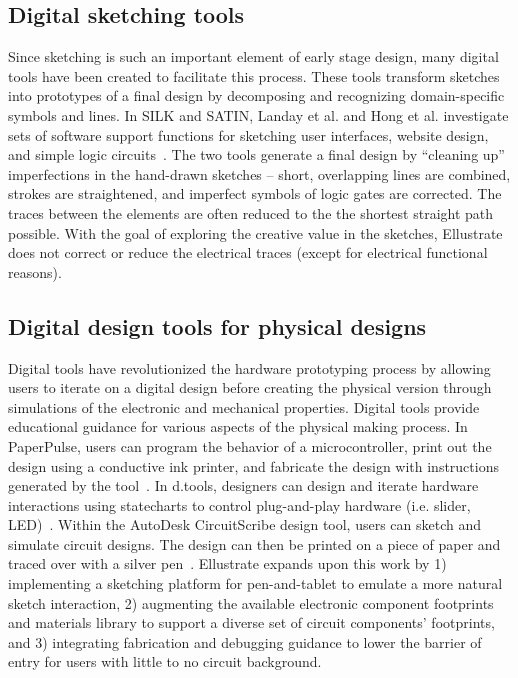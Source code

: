 \documentclass{sigchi}
\begin{document}
\subsection{Digital sketching tools} 
Since sketching is such an important element of early stage design, many digital tools have been created to facilitate this process. These tools transform sketches into prototypes of a final design by decomposing and recognizing domain-specific symbols and lines. In SILK and SATIN, Landay et al. and Hong et al. investigate sets of software support functions for sketching user interfaces, website design, and simple logic circuits~\cite{Hong:2007ta,Landay:1996wn}. The two tools generate a final design by ``cleaning up'' imperfections in the hand-drawn sketches -- short, overlapping lines are combined, strokes are straightened, and imperfect symbols of logic gates are corrected. The traces between the elements are often reduced to the the shortest straight path possible. With the goal of exploring the creative value in the sketches, Ellustrate does not correct or reduce the electrical traces (except for electrical functional reasons). 


\subsection{Digital design tools for physical designs}
Digital tools have revolutionized the hardware prototyping process by allowing users to iterate on a digital design before creating the physical version through simulations of the electronic and mechanical properties. Digital tools provide educational guidance for various aspects of the physical making process. In PaperPulse, users can program the behavior of a microcontroller, print out the design using a conductive ink printer, and fabricate the design with instructions generated by the tool~\cite{RafRamakers:2015gb}. In d.tools, designers can design and iterate hardware interactions using statecharts to control plug-and-play hardware (i.e. slider, LED)~\cite{hartmann_reflective_2006}. Within the AutoDesk CircuitScribe design tool, users can sketch and simulate circuit designs. The design can then be printed on a piece of paper and traced over with a silver pen~\cite{_autodesk_2016}. Ellustrate expands upon this work by 1) implementing a sketching platform for pen-and-tablet to emulate a more natural sketch interaction, 2) augmenting the available electronic component footprints and materials library to support a diverse set of circuit components' footprints, and 3) integrating fabrication and debugging guidance to lower the barrier of entry for users with little to no circuit background.
\end{document}
